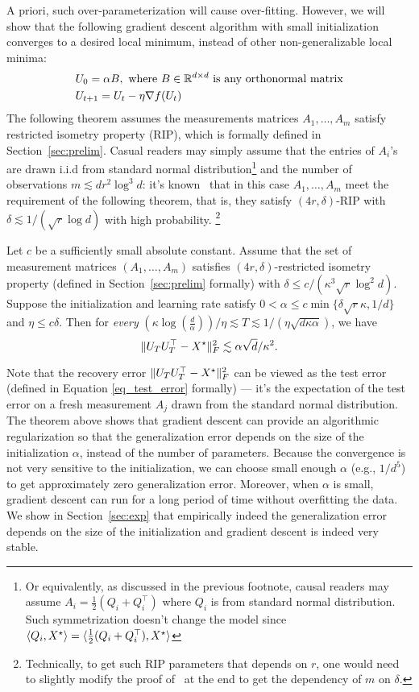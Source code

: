 A priori, such over-parameterization will cause over-fitting. However, we will show that the following gradient descent algorithm with small initialization converges to a desired local minimum, instead of other non-generalizable local minima:
\begin{align}
& U_0 = \alpha B, \textup{   where $B\in \mathbb{R}^{d\times d}$ is any orthonormal matrix}\nonumber\\
& U_{t+1} = U_t - \eta \nabla f(U_t)\label{eqn:init}
\end{align}
The following theorem assumes the measurements matrices $A_1,\dots, A_m$ satisfy restricted isometry property (RIP),  which is formally defined in Section~\ref{sec:prelim}. Casual readers may simply assume that the entries of $A_i$'s are drawn i.i.d from standard normal distribution\footnote{Or equivalently, as discussed in the previous footnote, causal readers may assume $A_i = \frac{1}{2}(Q_i+Q_i^\top)$ where $Q_i$ is from standard normal distribution. Such symmetrization doesn't change the model since $\langle Q_i, {X}^\star \rangle = \langle \frac{1}{2}(Q_i+Q_i^\top), {X}^\star \rangle$ } and the number of observations $m \lesssim dr^{2}\log^3 d$: it's known~\cite{recht2010guaranteed} that in this case $A_1,\dots, A_m$ meet the requirement of the following theorem, that is, they satisfy $(4r,\delta)$-RIP with $\delta \lesssim 1/(\sqrt{r}\log d)$ with high probability.
\footnote{Technically, to get such RIP parameters that depends on $r$, one would need to slightly modify the proof of~\cite[Theorem 4.2]{recht2010guaranteed} at the end to get the dependency of $m$ on $\delta$. } 

\begin{thm}\label{thm:intro-main}
	Let $c$ be a sufficiently small absolute constant. Assume that the set of measurement matrices $(A_1,\dots, A_m)$ satisfies $(4r,\delta)$-restricted isometry property (defined in Section~\ref{sec:prelim} formally) with $\delta \le c/(\kappa^3\sqrt{r}\log^2 d)$. Suppose the initialization and learning rate satisfy $0< \alpha \le c\min\{\delta\sqrt{r}\kappa, 1/d\}$ and $\eta \le c\delta$. Then for \emph{every} $(\kappa\log (\frac d {\alpha}))/\eta\lesssim T \lesssim  1/(\eta\sqrt{d\kappa \alpha})$, we have
	$$\|U_TU_T^\top-{X}^\star\|_F^2 \lesssim {\alpha} \sqrt d / \kappa^2. $$
\end{thm}

Note that the recovery error $\|U_TU_T^\top-{X}^\star\|_F^2$ can be viewed as the test error (defined in Equation \eqref{eq_test_error} formally) --- it's the expectation of the test error on a fresh measurement $A_j$ drawn from the standard normal distribution. The theorem above shows that gradient descent can provide an algorithmic regularization so that the generalization error depends on the size of the initialization $\alpha$, instead of the number of parameters. Because the convergence is not very sensitive to the initialization, we can choose small enough $\alpha$ (e.g., $1/d^{5}$) to get approximately zero generalization error. Moreover, when $\alpha$ is small, gradient descent can run for a long period of time without overfitting the data. We show in Section~\ref{sec:exp} that empirically indeed the generalization error depends on the size of the initialization and gradient descent is indeed very stable. 

